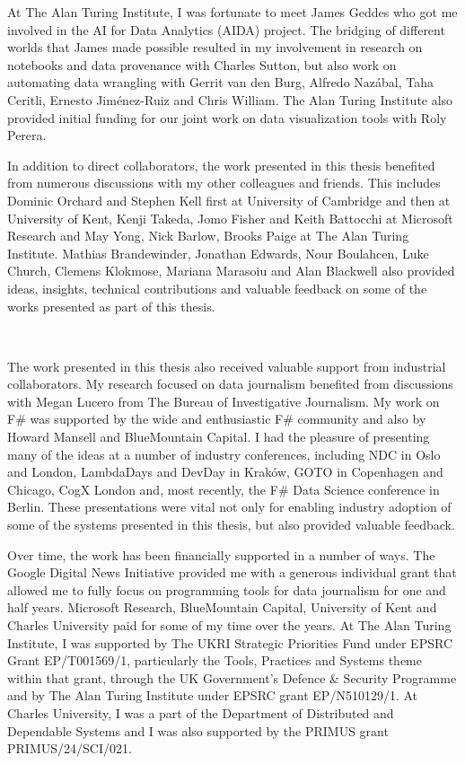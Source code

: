 \documentclass[fleqn,11pt]{report}
\theoremstyle{definition}
\begin{document}
At The Alan Turing Institute, I was fortunate to meet James Geddes who got me involved in the
AI for Data Analytics (AIDA) project. The bridging of different worlds that James made possible
resulted in my involvement in research on notebooks and data provenance with Charles Sutton,
but also work on automating data wrangling with Gerrit van den Burg, Alfredo Naz\'abal, Taha Ceritli,
Ernesto Jim\'enez-Ruiz and Chris William. The Alan Turing Institute also provided initial funding
for our joint work on data visualization tools with Roly Perera.

In addition to direct collaborators, the work presented in this thesis benefited from numerous
discussions with my other colleagues and friends. This includes Dominic Orchard and Stephen Kell
first at University of Cambridge and then at University of Kent,
Kenji Takeda, Jomo Fisher and Keith Battocchi at Microsoft Research
and May Yong, Nick Barlow, Brooks Paige at The Alan Turing Institute.
Mathias Brandewinder, Jonathan Edwards, Nour Boulahcen, Luke Church, Clemens Klokmose,
Mariana Marasoiu and Alan Blackwell also provided ideas, insights, technical contributions
and valuable feedback on some of the works presented as part of this thesis.

~

The work presented in this thesis also received valuable support from industrial collaborators.
My research focused on data journalism benefited from discussions with
Megan Lucero from The Bureau of Investigative Journalism. My work on F\# was supported by
the wide and enthusiastic F\# community and also by Howard Mansell and BlueMountain Capital.
I had the pleasure of presenting many of the ideas at a number of industry conferences,
including NDC in Oslo and London, LambdaDays and DevDay in Krak\'ow, GOTO in Copenhagen and Chicago,
CogX London and, most recently, the F\# Data Science conference in Berlin. These presentations
were vital not only for enabling industry adoption of some of the systems presented in this thesis,
but also provided valuable feedback.

Over time, the work has been financially supported in a number of ways. The Google Digital News
Initiative provided me with a generous individual grant that allowed me to fully focus on
programming tools for data journalism for one and half years. Microsoft Research,
BlueMountain Capital, University of Kent and Charles University paid for some of my time over
the years. At The Alan Turing Institute, I was supported by The UKRI Strategic Priorities Fund
under EPSRC Grant EP/T001569/1, particularly the Tools, Practices and Systems theme within that
grant, through the UK Government's Defence & Security Programme and by The Alan Turing Institute
under EPSRC grant EP/N510129/1. At Charles University, I was a part of the
Department of Distributed and Dependable Systems and I was also supported by the PRIMUS
grant PRIMUS/24/SCI/021.
\end{document}
